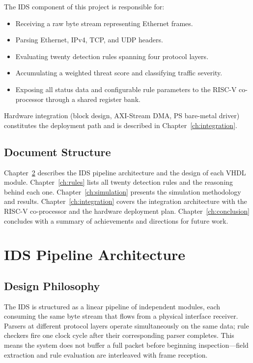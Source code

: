 \documentclass[12pt, a4paper]{report}
\begin{document}
The IDS component of this project is responsible for:
\begin{itemize}
    \item Receiving a raw byte stream representing Ethernet frames.
    \item Parsing Ethernet, IPv4, TCP, and UDP headers.
    \item Evaluating twenty detection rules spanning four protocol layers.
    \item Accumulating a weighted threat score and classifying traffic severity.
    \item Exposing all status data and configurable rule parameters to the RISC-V co-processor through a shared register bank.
\end{itemize}

Hardware integration (block design, AXI-Stream DMA, PS bare-metal driver) constitutes the deployment path and is described in Chapter~\ref{ch:integration}.

\section{Document Structure}

Chapter~\ref{ch:architecture} describes the IDS pipeline architecture and the design of each VHDL module. Chapter~\ref{ch:rules} lists all twenty detection rules and the reasoning behind each one. Chapter~\ref{ch:simulation} presents the simulation methodology and results. Chapter~\ref{ch:integration} covers the integration architecture with the RISC-V co-processor and the hardware deployment plan. Chapter~\ref{ch:conclusion} concludes with a summary of achievements and directions for future work.

\chapter{IDS Pipeline Architecture}
\label{ch:architecture}

\section{Design Philosophy}

The IDS is structured as a linear pipeline of independent modules, each consuming the same byte stream that flows from a physical interface receiver. Parsers at different protocol layers operate simultaneously on the same data; rule checkers fire one clock cycle after their corresponding parser completes. This means the system does not buffer a full packet before beginning inspection---field extraction and rule evaluation are interleaved with frame reception.
\end{document}
